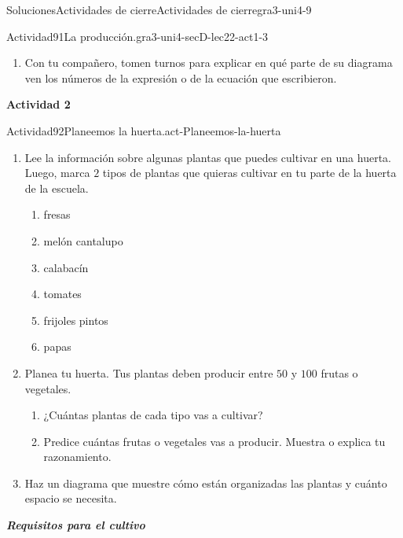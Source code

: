 \documentclass[twoside,10pt,]{article}
\newcommand{\alert}[1]{\textbf{\textit{#1}}}
\begin{document}
\begin{solutions-section}{Soluciones}{Actividades de cierre}{}{Actividades de cierre}{}{}{gra3-uni4-9}
\begin{activitysolution}{Actividad}{91}{La producción.}{gra3-uni4-secD-lec22-act1-3}
\begin{enumerate}
\begin{enumerate}
\item{}Para cultivar fresas de la mejor manera, las filas deben estar separadas por \(4\) pies. En cada fila, debe haber \(2\) pies de distancia entre planta y planta. ¿Qué tan larga y qué tan ancha es la parcela de fresas?%
\item{}Se pueden cosechar \(12\) fresas de cada planta. ¿Cuántas fresas van a crecer en cada fila?%
\end{enumerate}
\item{}Con tu compañero, tomen turnos para explicar en qué parte de su diagrama ven los números de la expresión o de la ecuación que escribieron.%
\end{enumerate}
\end{activitysolution}%
\par\medskip
\noindent\textbf{\large{}\space\textperiodcentered\space{}Actividad 2}
\begin{activitysolution}{Actividad}{92}{Planeemos la huerta.}{act-Planeemos-la-huerta}%
%
\begin{enumerate}
\item{}Lee la información sobre algunas plantas que puedes cultivar en una huerta. Luego, marca \(2\) tipos de plantas que quieras cultivar en tu parte de la huerta de la escuela.%
%
\begin{enumerate}
\item{}fresas%
\item{}melón cantalupo%
\item{}calabacín%
\item{}tomates%
\item{}frijoles pintos%
\item{}papas%
\end{enumerate}
\item{}Planea tu huerta. Tus plantas deben producir entre \(50\) y \(100\) frutas o vegetales.%
%
\begin{enumerate}
\item{}¿Cuántas plantas de cada tipo vas a cultivar?%
\item{}Predice cuántas frutas o vegetales vas a producir. Muestra o explica tu razonamiento.%
\end{enumerate}
\item{}Haz un diagrama que muestre cómo están organizadas las plantas y cuánto espacio se necesita.%
\end{enumerate}
\alert{Requisitos para el cultivo}%
\begin{sidebyside}{2}{0}{0}{0}%
\begin{sbspanel}{0.5}%

\end{sbspanel}
\end{sidebyside}
\end{activitysolution}
\end{solutions-section}
\end{document}
